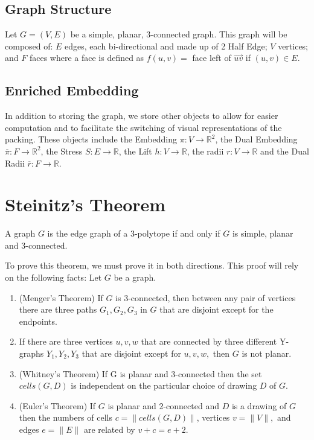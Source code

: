 \documentclass{article}
\begin{document}
\subsection{Graph Structure}
  Let $G=(V,E)$ be a simple, planar, 3-connected graph. This graph will be composed of: $E$ edges, each bi-directional and made up of 2 Half Edge; $V$ vertices; and $F$ faces where a face is defined as $f(u,v) =$ face left of $\overrightarrow{uv}$ if $(u,v)\in E$.
\subsection{Enriched Embedding}
  In addition to storing the graph, we store other objects to allow for easier computation and to facilitate the switching of visual representations of the packing. These objects include the Embedding $\pi : V \rightarrow \mathbb{R}^2$, the Dual Embedding $\overline{\pi} : F \rightarrow \mathbb{R}^2$, the Stress $S : E \rightarrow \mathbb{R}$, the Lift $h : V \rightarrow \mathbb{R}$, the radii $r : V \rightarrow \mathbb{R}$ and the Dual Radii $\overline{r} : F \rightarrow \mathbb{R}$.

\section{Steinitz's Theorem}
 A graph $G$ is the edge graph of a 3-polytope if and only if $G$ is simple, planar and 3-connected.
 
 To prove this theorem, we must prove it in both directions. This proof will rely on the following facts:
 Let $G$ be a graph.
 \begin{enumerate}
 	\item (Menger's Theorem) If $G$ is 3-connected, then between any pair of vertices there are three paths $G_1, G_2, G_3$ in $G$ that are disjoint except for the endpoints.
	\item If there are three vertices $u,v,w$ that are connected by three different Y-graphs $Y_1, Y_2, Y_3$ that are disjoint except for $u,v,w,$ then $G$ is not planar.
	\item (Whitney's Theorem) If G is planar and 3-connected then the set $cells(G,D)$ is independent on the particular choice of drawing $D$ of $G$.
	\item (Euler's Theorem) If $G$ is planar and 2-connected and $D$ is a drawing of $G$ then the numbers of cells $c= \|cells(G,D)\|$, vertices $v = \|V\|,$ and edges $e = \|E\|$ are related by  $v+c = e+2$.
	
 \end{enumerate}
 
\end{document}
